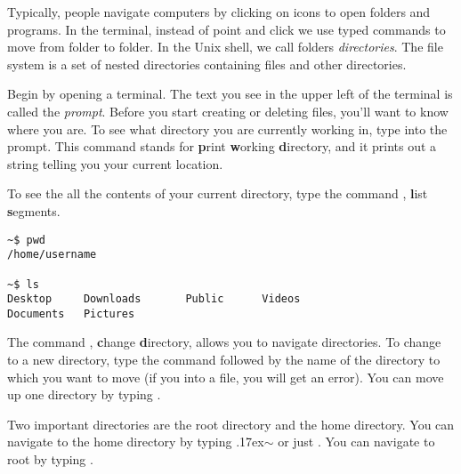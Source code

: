 Typically, people navigate computers by clicking on icons to open folders and programs.
In the terminal, instead of point and click we use typed commands to move from folder to folder.
In the Unix shell, we call folders \emph{directories}.
The file system is a set of nested directories containing files and other directories.

Begin by opening a terminal.
The text you see in the upper left of the terminal is called the \emph{prompt}.
Before you start creating or deleting files, you'll want to know where you are.
To see what directory you are currently working in, type  into the prompt.
This command stands for \textbf{p}rint \textbf{w}orking \textbf{d}irectory, and it prints out a string telling you your current location.

To see the all the contents of your current directory, type the command , \textbf{l}ist \textbf{s}egments.

\begin{lstlisting}
~$ pwd
/home/username

~$ ls
Desktop		Downloads		Public 		Videos
Documents 	Pictures
\end{lstlisting}

The command , \textbf{c}hange \textbf{d}irectory, allows you to navigate directories.
To change to a new directory, type the  command followed by the name of the directory to which you want to move (if you  into a file, you will get an error).
You can move up one directory by typing .

Two important directories are the root directory and the home directory.
You can navigate to the home directory by typing  \raise.17ex\hbox{$\scriptstyle\sim$} or just .
You can navigate to root by typing .

